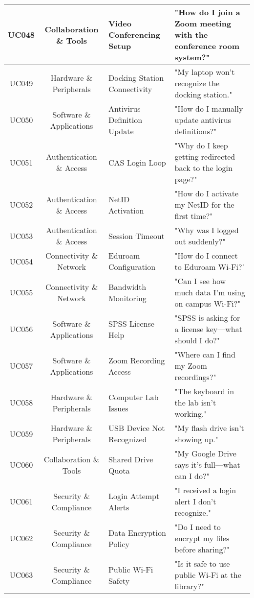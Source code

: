 \documentclass{article.cls}
\begin{document}
\begin{longtable}{|c|c|p{3.5cm}|p{6.5cm}|}
        \hline
        UC048 & Collaboration \& Tools & Video Conferencing Setup & "How do I join a Zoom meeting with the conference room system?" \\
        \hline
        UC049 & Hardware \& Peripherals & Docking Station Connectivity & "My laptop won’t recognize the docking station." \\
        \hline
        UC050 & Software \& Applications & Antivirus Definition Update & "How do I manually update antivirus definitions?" \\
        \hline
        UC051 & Authentication \& Access & CAS Login Loop & "Why do I keep getting redirected back to the login page?" \\
        \hline
        UC052 & Authentication \& Access & NetID Activation & "How do I activate my NetID for the first time?" \\
        \hline
        UC053 & Authentication \& Access & Session Timeout & "Why was I logged out suddenly?" \\
        \hline
        UC054 & Connectivity \& Network & Eduroam Configuration & "How do I connect to Eduroam Wi-Fi?" \\
        \hline
        UC055 & Connectivity \& Network & Bandwidth Monitoring & "Can I see how much data I'm using on campus Wi-Fi?" \\
        \hline
        UC056 & Software \& Applications & SPSS License Help & "SPSS is asking for a license key—what should I do?" \\
        \hline
        UC057 & Software \& Applications & Zoom Recording Access & "Where can I find my Zoom recordings?" \\
        \hline
        UC058 & Hardware \& Peripherals & Computer Lab Issues & "The keyboard in the lab isn't working." \\
        \hline
        UC059 & Hardware \& Peripherals & USB Device Not Recognized & "My flash drive isn’t showing up." \\
        \hline
        UC060 & Collaboration \& Tools & Shared Drive Quota & "My Google Drive says it's full—what can I do?" \\
        \hline
        UC061 & Security \& Compliance & Login Attempt Alerts & "I received a login alert I don't recognize." \\
        \hline
        UC062 & Security \& Compliance & Data Encryption Policy & "Do I need to encrypt my files before sharing?" \\
        \hline
        UC063 & Security \& Compliance & Public Wi-Fi Safety & "Is it safe to use public Wi-Fi at the library?" \\

\end{longtable}
\end{document}
